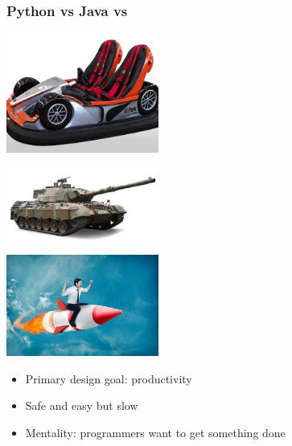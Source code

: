 \begin{frame}
  \frametitle{Python vs Java vs \cpp}
  \begin{overprint}


    \structure{\cpp}
  \end{overprint}

  \begin{overprint}
    \begin{center}
      \includegraphics[width=5cm]{bumper.jpg}
    \end{center}

    \begin{center}
      \includegraphics[width=5cm]{tank.jpg}
    \end{center}

    \begin{center}
      \includegraphics[width=5cm]{missile.jpg}
    \end{center}
  \end{overprint}

  \begin{overprint}
    \begin{itemize}
      \item Primary design goal: productivity
      \item Safe and easy but slow
      \item Mentality: programmers want to get something done
    \end{itemize}


\end{overprint}
\end{frame}
